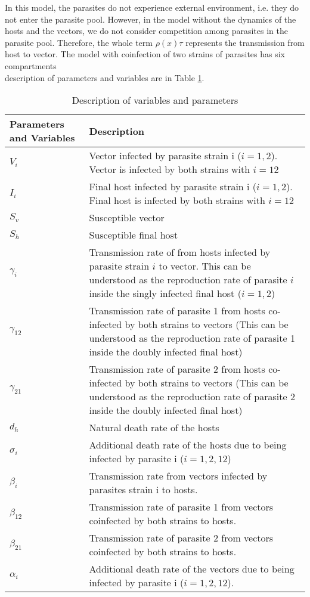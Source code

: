 \documentclass{article}
\begin{document}
In this model, the parasites do not experience external environment, i.e. they do not enter the parasite pool. However, in the model without the dynamics of the hosts and the vectors, we do not consider competition among parasites in the parasite pool. Therefore, the whole term $\rho(x) \tau$ represents the transmission from host to vector. The model with coinfection of two strains of parasites has six compartments \\ description of parameters and variables are in Table \ref{table:varpardescription}.

\begin{table}
\begin{tabular}{|p{3cm}|p{8cm}|} 
\hline
Parameters and Variables    &  Description  \\
\hline
$V_i$     & Vector infected by parasite strain i ($i = 1, 2$). Vector is infected by both strains with $i = 12$ \\
\hline
$I_i$ & Final host infected by parasite strain i ($i = 1, 2$). Final host is infected by both strains with $i = 12$ \\
\hline
$S_v$ & Susceptible vector \\
\hline
$S_h$ & Susceptible final host \\
\hline
$\gamma_i$ & Transmission rate of from hosts infected by parasite strain $i$ to vector. This can be understood as the reproduction rate of parasite $i$ inside the singly infected final host ($i = 1, 2$) \\
\hline
$\gamma_{12}$ & Transmission rate of parasite 1 from hosts co-infected by both strains to vectors (This can be understood as the reproduction rate of parasite 1 inside the doubly infected final host) \\
\hline
$\gamma_{21}$ & Transmission rate of parasite 2 from hosts co-infected by both strains to vectors (This can be understood as the reproduction rate of parasite 2 inside the doubly infected final host) \\
\hline
$d_h$ & Natural death rate of the hosts \\
\hline
$\sigma_i$ & Additional death rate of the hosts due to being infected by parasite i ($i = 1, 2, 12$) \\
\hline
$\beta_i$ & Transmission rate from vectors infected by parasites strain i to hosts. \\
\hline
$\beta_{12}$ & Transmission rate of parasite 1 from vectors coinfected by both strains to hosts.\\
\hline
$\beta_{21}$ & Transmission rate of parasite 2 from vectors coinfected by both strains to hosts. \\
\hline
$\alpha_i$ & Additional death rate of the vectors due to being infected by parasite i ($i = 1, 2, 12$). \\
\hline
\end{tabular}
\caption{Description of variables and parameters}
\label{table:varpardescription}
\end{table}
\end{document}
